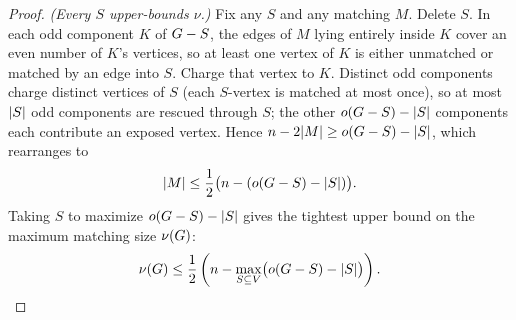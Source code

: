 \begin{proof}
\emph{(Every $S$ upper-bounds $\nu$.)} Fix any $S$ and any matching $M$. Delete $S$. In each odd
component $K$ of $G-S$, the edges of $M$ lying entirely inside $K$ cover an even number of $K$'s
vertices, so at least one vertex of $K$ is either unmatched or matched by an edge into $S$. Charge that
vertex to $K$. Distinct odd components charge distinct vertices of $S$ (each $S$-vertex is matched at
most once), so at most $\lvert S\rvert$ odd components are rescued through $S$; the other
$o(G-S)-\lvert S\rvert$ components each contribute an exposed vertex. Hence $n-2\lvert M\rvert\ge o(G-S)-\lvert S\rvert$, which rearranges to
\[
\lvert M\rvert \le \frac{1}{2}\bigl(n - (o(G-S) - \lvert S\rvert)\bigr).
\]
Taking $S$ to maximize $o(G-S) - \lvert S\rvert$ gives the tightest upper bound on the maximum matching size $\nu(G)$:
\[
\nu(G) \le \frac{1}{2}\left(n - \max_{S\subseteq V}\bigl(o(G-S) - \lvert S\rvert\bigr)\right).
\]


\end{proof}
